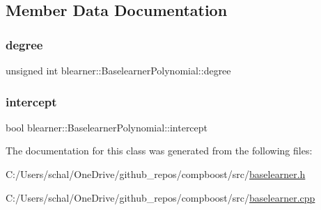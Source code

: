 \subsection{Member Data Documentation}
\mbox{\label{classblearner_1_1_baselearner_polynomial_a6841e90a66b12f3f345f6e563df78baf}} 
\subsubsection{\texorpdfstring{degree}{degree}}
{\footnotesize\ttfamily unsigned int blearner\+::\+Baselearner\+Polynomial\+::degree\hspace{0.3cm}{\ttfamily [private]}}

\mbox{\label{classblearner_1_1_baselearner_polynomial_af72326177abcf1fae10a32f9dfdd6a6e}} 
\subsubsection{\texorpdfstring{intercept}{intercept}}
{\footnotesize\ttfamily bool blearner\+::\+Baselearner\+Polynomial\+::intercept\hspace{0.3cm}{\ttfamily [private]}}



The documentation for this class was generated from the following files\+:\begin{DoxyCompactItemize}
\item 
C\+:/\+Users/schal/\+One\+Drive/github\+\_\+repos/compboost/src/\mbox{\hyperlink{baselearner_8h}{baselearner.\+h}}\item 
C\+:/\+Users/schal/\+One\+Drive/github\+\_\+repos/compboost/src/\mbox{\hyperlink{baselearner_8cpp}{baselearner.\+cpp}}\end{DoxyCompactItemize}
